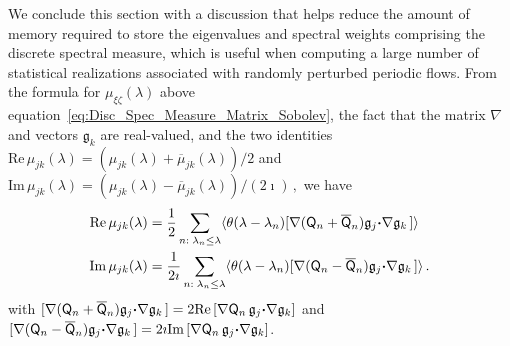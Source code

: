 \documentclass[english,12pt,jmp,graphicx]{revtex4-1}
\newcommand{\vecg}{\mathfrak{g}}
\newcommand{\bcdot}{\mbox{\boldmath${\cdot}$}}
\newcommand{\Real}{\mbox{Re}\,}
\newcommand{\Imag}{\mbox{Im}\,}
\newcommand{\Qm}{\mathsf{Q}}
\begin{document}
We conclude this
section with a discussion that helps reduce the amount of memory
required to store the eigenvalues and spectral weights comprising the
discrete spectral measure, which is
useful when computing a large number of statistical realizations
associated with randomly perturbed periodic flows.
From the formula for $\mu_{\xi\zeta}(\lambda)$ above
equation~\eqref{eq:Disc_Spec_Measure_Matrix_Sobolev}, the fact that
the matrix $\nabla$ and vectors $\vecg_k$ are real-valued, and the two 
identities
$\Real\mu_{jk}(\lambda)
=(\mu_{jk}(\lambda)+\overline{\mu}_{jk}(\lambda))/2$
and 
$\Imag\mu_{jk}(\lambda)
=(\mu_{jk}(\lambda)-\overline{\mu}_{jk}(\lambda))/(2\imath)\,,$
we have 
%
\begin{align}\label{eq:Signed_mu_Dis}
\Real\mu_{jk}(\lambda)&=
 \frac{1}{2}\sum_{n:\;\lambda_n\leq\lambda}
 \langle\theta(\lambda-\lambda_n)[\nabla(\Qm_n+\overline{\Qm}_n)\vecg_j\bcdot\nabla\vecg_k\,]\rangle
\\
\Imag\mu_{jk}(\lambda)&=
 \frac{1}{2\imath}\sum_{n:\;\lambda_n\leq\lambda}
 \langle\theta(\lambda-\lambda_n)[\nabla(\Qm_n-\overline{\Qm}_n)\vecg_j\bcdot\nabla\vecg_k\,]\rangle\,.
\notag
\end{align}
%
with
$[\nabla(\Qm_n+\overline{\Qm}_n)\vecg_j\bcdot\nabla\vecg_k\,]
=2\Real[\nabla\Qm_n\,\vecg_j\bcdot\nabla\vecg_k]$
and $[\nabla(\Qm_n-\overline{\Qm}_n)\vecg_j\bcdot\nabla\vecg_k\,]
=2\imath\Imag[\nabla\Qm_n\,\vecg_j\bcdot\nabla\vecg_k]$.
\end{document}
